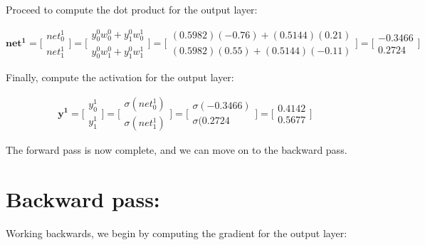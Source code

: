 \documentclass{article}
\begin{document}
Proceed to compute the dot product for the output layer:

\begin{equation}
    \mathbf{net^1} = \bigg[\begin{matrix} net_0^1 \\ net_1^1 \end{matrix}\bigg] =
    \bigg[\begin{matrix} y_0^0 w_0^0 + y_1^0 w_0^1 \\ y_0^0 w_1^0 + y_1^0 w_1^1 \end{matrix}\bigg] = 
    \bigg[\begin{matrix} (0.5982)(-0.76) + (0.5144)(0.21) \\ (0.5982)(0.55) + (0.5144)(-0.11) \end{matrix}\bigg] =
    \bigg[\begin{matrix} -0.3466 \\ 0.2724 \end{matrix}\bigg]
\end{equation}

Finally, compute the activation for the output layer:

\begin{equation}
    \mathbf{y^1} = \bigg[\begin{matrix} y_0^1 \\ y_1^1 \end{matrix}\bigg] =
    \bigg[\begin{matrix} \sigma(net_0^1) \\ \sigma(net_1^1) \end{matrix}\bigg] = 
    \bigg[\begin{matrix} \sigma(-0.3466 ) \\ \sigma(0.2724 \end{matrix}\bigg] =
    \bigg[\begin{matrix} 0.4142 \\ 0.5677 \end{matrix}\bigg]
\end{equation}

The forward pass is now complete, and we can move on to the backward pass.

\section*{Backward pass:}

Working backwards, we begin by computing the gradient for the output layer:
\end{document}
